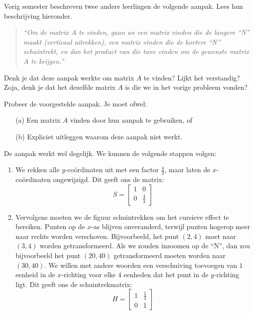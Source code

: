 \documentclass{ximera}
\begin{document}
\begin{exercise}
Vorig semester beschreven twee andere leerlingen de volgende aanpak.
Lees hun beschrijving hieronder.

\begin{quote}
\textit{``Om de matrix $A$ te vinden, gaan we een matrix vinden die de langere ``N'' maakt (verticaal uitrekken), een matrix vinden die de kortere ``N'' schuintrekt, en dan het product van die twee vinden om de gewenste matrix $A$ te krijgen.''}
\end{quote}

Denk je dat deze aanpak werkte om matrix $A$ te vinden?
Lijkt het verstandig?
Zoja, denk je dat het dezelfde matrix $A$ is die we in het vorige probleem vonden?
\end{exercise}

\begin{exercise}
Probeer de voorgestelde aanpak. Je moet ofwel:
\begin{enumerate}
\item[(a)] Een matrix $A$ vinden door hun aanpak te gebruiken, of
\item[(b)] Expliciet uitleggen waarom deze aanpak niet werkt.
\end{enumerate}
\begin{oplossing}
    De aanpak werkt wel degelijk. We kunnen de volgende stappen volgen:
    \begin{enumerate}
        \item We rekken alle \(y\)-coördinaten uit met een factor \(\frac{4}{3}\), maar laten de \(x\)-coördinaten ongewijzigd. Dit geeft ons de matrix:
        \[S = \begin{bmatrix} 1 & 0 \\ 0 & \frac{4}{3} \end{bmatrix}\]
        \item Vervolgens moeten we de figuur schuintrekken om het cursieve effect te bereiken.
        Punten op de \(x\)-as blijven onveranderd, terwijl punten hogerop meer naar rechts worden verschoven.
        Bijvoorbeeld, het punt \((2, 4)\) moet naar \((3, 4)\) worden getransformeerd.
        Als we zouden inzoomen op de ``N'', dan zou bijvoorbeeld het punt \((20,40)\) getransformeerd moeten worden naar \((30,40)\).
        We willen met andere woorden een verschuiving toevoegen van \(1\) eenheid in de \(x\)-richting voor elke \(4\) eenheden dat het punt in de \(y\)-richting ligt.
        Dit geeft ons de schuintrekmatrix:
        \[H = \begin{bmatrix} 1 & \frac{1}{4} \\ 0 & 1 \end{bmatrix}\]

\end{enumerate}
\end{oplossing}
\end{exercise}
\end{document}
